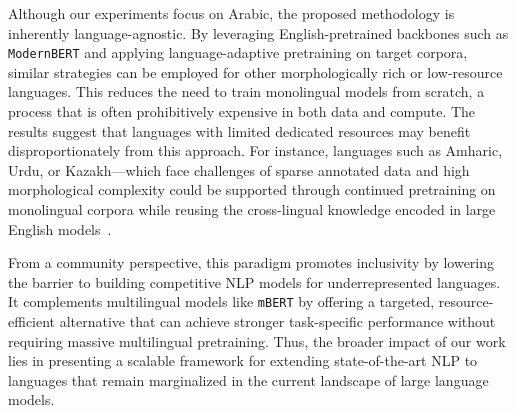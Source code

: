 Although our experiments focus on Arabic, the proposed methodology is inherently language-agnostic. By leveraging English-pretrained backbones such as \texttt{ModernBERT} and applying language-adaptive pretraining on target corpora, similar strategies can be employed for other morphologically rich or low-resource languages. This reduces the need to train monolingual models from scratch, a process that is often prohibitively expensive in both data and compute.  
The results suggest that languages with limited dedicated resources may benefit disproportionately from this approach. For instance, languages such as Amharic, Urdu, or Kazakh—which face challenges of sparse annotated data and high morphological complexity could be supported through continued pretraining on monolingual corpora while reusing the cross-lingual knowledge encoded in large English models~\cite{Wiemerslage2022MorphologicalPO}.  

From a community perspective, this paradigm promotes inclusivity by lowering the barrier to building competitive NLP models for underrepresented languages. It complements multilingual models like \texttt{mBERT} by offering a targeted, resource-efficient alternative that can achieve stronger task-specific performance without requiring massive multilingual pretraining. Thus, the broader impact of our work lies in presenting a scalable framework for extending state-of-the-art NLP to languages that remain marginalized in the current landscape of large language models.
